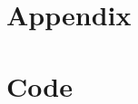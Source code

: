 \documentclass{article}
\begin{document}
\section*{Appendix}
\appendix

\newpage
\section{Code}\label{appendix:code}






\end{document}
